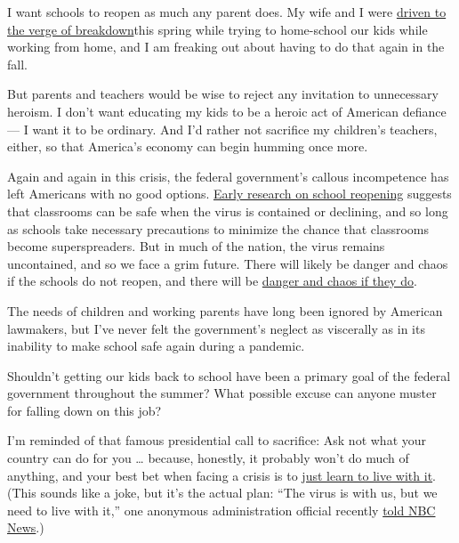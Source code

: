 I want schools to reopen as much any parent does. My wife and I were
\href{https://www.nytimes3xbfgragh.onion/2020/04/22/opinion/coronavirus-parenting-burnout.html}{driven
to the verge of breakdown}this spring while trying to home-school our
kids while working from home, and I am freaking out about having to do
that again in the fall.

But parents and teachers would be wise to reject any invitation to
unnecessary heroism. I don't want educating my kids to be a heroic act
of American defiance --- I want it to be ordinary. And I'd rather not
sacrifice my children's teachers, either, so that America's economy can
begin humming once more.

Again and again in this crisis, the federal government's callous
incompetence has left Americans with no good options.
\href{https://www.sciencemag.org/news/2020/07/school-openings-across-globe-suggest-ways-keep-coronavirus-bay-despite-outbreaks}{Early
research on school reopening} suggests that classrooms can be safe when
the virus is contained or declining, and so long as schools take
necessary precautions to minimize the chance that classrooms become
superspreaders. But in much of the nation, the virus remains
uncontained, and so we face a grim future. There will likely be danger
and chaos if the schools do not reopen, and there will be
\href{https://www.nytimes3xbfgragh.onion/2020/07/10/us/politics/trump-schools-reopening.html?searchResultPosition=1}{danger
and chaos if they do}.

The needs of children and working parents have long been ignored by
American lawmakers, but I've never felt the government's neglect as
viscerally as in its inability to make school safe again during a
pandemic.

Shouldn't getting our kids back to school have been a primary goal of
the federal government throughout the summer? What possible excuse can
anyone muster for falling down on this job?

I'm reminded of that famous presidential call to sacrifice: Ask not what
your country can do for you \ldots{} because, honestly, it probably
won't do much of anything, and your best bet when facing a crisis is to
\href{https://www.nytimes3xbfgragh.onion/2020/03/18/opinion/coronavirus-trump.html}{just
learn to live with it}. (This sounds like a joke, but it's the actual
plan: ``The virus is with us, but we need to live with it,'' one
anonymous administration official recently
\href{https://www.nbcnews.com/politics/politics-news/we-need-live-it-white-house-readies-new-message-nation-n1232884}{told
NBC News}.)

